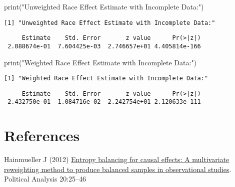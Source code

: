 \documentclass[
  letterpaper,
  DIV=11,
  numbers=noendperiod]{scrartcl}
\newenvironment{Shaded}{\begin{snugshade}}{\end{snugshade}}
\newcommand{\FunctionTok}[1]{\textcolor[rgb]{0.28,0.35,0.67}{#1}}
\newcommand{\NormalTok}[1]{\textcolor[rgb]{0.00,0.23,0.31}{#1}}
\newcommand{\SpecialCharTok}[1]{\textcolor[rgb]{0.37,0.37,0.37}{#1}}
\newcommand{\StringTok}[1]{\textcolor[rgb]{0.13,0.47,0.30}{#1}}
\newlength{\cslhangindent}
\newlength{\cslentryspacingunit} %
\newenvironment{CSLReferences}[2] %
 {%
  \setlength{\parindent}{0pt}
  \ifodd #1
  \let\oldpar\par
  \def\par{\hangindent=\cslhangindent\oldpar}
  \fi
  \setlength{\parskip}{#2\cslentryspacingunit}
 }%
 {}
\begin{document}
\begin{Shaded}
\begin{Highlighting}[]
\FunctionTok{print}\NormalTok{(}\StringTok{"Unweighted Race Effect Estimate with Incomplete Data:"}\NormalTok{)}
\end{Highlighting}
\end{Shaded}

\begin{verbatim}
[1] "Unweighted Race Effect Estimate with Incomplete Data:"
\end{verbatim}

\begin{Shaded}
\end{Shaded}

\begin{verbatim}
     Estimate    Std. Error       z value      Pr(>|z|) 
 2.088674e-01  7.604425e-03  2.746657e+01 4.405814e-166 
\end{verbatim}

\begin{Shaded}
\begin{Highlighting}[]
\FunctionTok{print}\NormalTok{(}\StringTok{"Weighted Race Effect Estimate with Incomplete Data:"}\NormalTok{)}
\end{Highlighting}
\end{Shaded}

\begin{verbatim}
[1] "Weighted Race Effect Estimate with Incomplete Data:"
\end{verbatim}

\begin{Shaded}
\end{Shaded}

\begin{verbatim}
     Estimate    Std. Error       z value      Pr(>|z|) 
 2.432750e-01  1.084716e-02  2.242754e+01 2.120633e-111 
\end{verbatim}

\hypertarget{references}{%
\section*{References}\label{references}}

\hypertarget{refs}{}
\begin{CSLReferences}{1}{0}
\leavevmode{}%
Hainmueller J (2012)
\href{https://www.jstor.org/stable/41403737}{Entropy balancing for
causal effects: A multivariate reweighting method to produce balanced
samples in observational studies}. Political Analysis 20:25--46

\end{CSLReferences}
\end{document}
